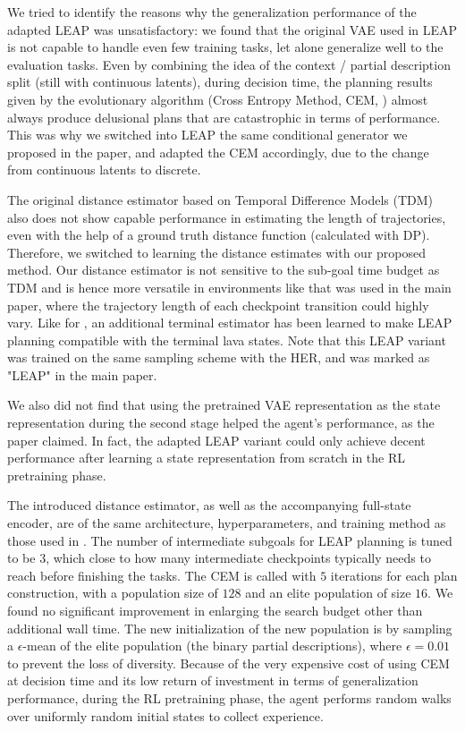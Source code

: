We tried to identify the reasons why the generalization performance of the adapted LEAP was unsatisfactory: we found that the original VAE used in LEAP is not capable to handle even few training tasks, let alone generalize well to the evaluation tasks. Even by combining the idea of the context / partial description split (still with continuous latents), during decision time, the planning results given by the evolutionary algorithm (Cross Entropy Method, CEM, \citet{RUBINSTEIN199789}) almost always produce delusional plans that are catastrophic in terms of performance. This was why we switched into LEAP the same conditional generator we proposed in the paper, and adapted the CEM accordingly, due to the change from continuous latents to discrete.

The original distance estimator based on Temporal Difference Models (TDM) also does not show capable performance in estimating the length of trajectories, even with the help of a ground truth distance function (calculated with DP). Therefore, we switched to learning the distance estimates with our proposed method. Our distance estimator is not sensitive to the sub-goal time budget as TDM and is hence more versatile in environments like that was used in the main paper, where the trajectory length of each checkpoint transition could highly vary. Like for \agentshort{}, an additional terminal estimator has been learned to make LEAP planning compatible with the terminal lava states. Note that this LEAP variant was trained on the same sampling scheme with the HER, and was marked as "LEAP" in the main paper.

We also did not find that using the pretrained VAE representation as the state representation during the second stage helped the agent's performance, as the paper claimed. In fact, the adapted LEAP variant could only achieve decent performance after learning a state representation from scratch in the RL pretraining phase.

The introduced distance estimator, as well as the accompanying full-state encoder, are of the same architecture, hyperparameters, and training method as those used in \agentshort{}. The number of intermediate subgoals for LEAP planning is tuned to be $3$, which close to how many intermediate checkpoints \agentshort{} typically needs to reach before finishing the tasks. The CEM is called with $5$ iterations for each plan construction, with a population size of $128$ and an elite population of size $16$. We found no significant improvement in enlarging the search budget other than additional wall time. The new initialization of the new population is by sampling a $\epsilon$-mean of the elite population (the binary partial descriptions), where $\epsilon = 0.01$ to prevent the loss of diversity. Because of the very expensive cost of using CEM at decision time and its low return of investment in terms of generalization performance, during the RL pretraining phase, the agent performs random walks over uniformly random initial states to collect experience.

